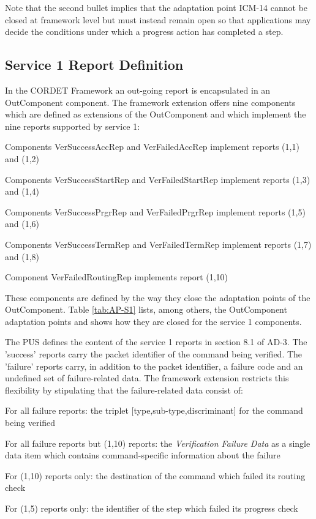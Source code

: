 \documentclass[a4paper,10pt]{article}
\newenvironment{fw_itemize}						%
{\begin{itemize}
  \setlength{\itemsep}{1mm}
  \setlength{\parskip}{0pt}
  \setlength{\parsep}{0pt}}
{\end{itemize}}
\begin{document}
Note that the second bullet implies that the adaptation point ICM-14 cannot be closed at framework level but must instead remain open so that applications may decide the conditions under which a progress action has completed a step.


\subsection{Service 1 Report Definition}\label{sec:serv1RepDef}
In the CORDET Framework an out-going report is encapsulated in an OutComponent component. The framework extension offers nine components which are defined as extensions of the OutComponent and which implement the nine reports supported by service 1:

\begin{fw_itemize}
\item Components VerSuccessAccRep and VerFailedAccRep implement reports (1,1) and (1,2) 
\item Components VerSuccessStartRep and VerFailedStartRep implement reports (1,3) and (1,4) 
\item Components VerSuccessPrgrRep and VerFailedPrgrRep implement reports (1,5) and (1,6) 
\item Components VerSuccessTermRep and VerFailedTermRep implement reports (1,7) and (1,8) 
\item Component VerFailedRoutingRep implements report (1,10)
\end{fw_itemize}

These components are defined by the way they close the adaptation points of the OutComponent. Table \ref{tab:AP-S1} lists, among others, the OutComponent adaptation points and shows how they are closed for the service 1 components.

The PUS defines the content of the service 1 reports in section 8.1 of AD-3. The 'success' reports carry the packet identifier of the command being verified. The 'failure' reports carry, in addition to the packet identifier, a failure code and an undefined set of failure-related data. The framework extension restricts this flexibility by stipulating that the failure-related data consist of: 

\begin{fw_itemize}
\item For all failure reports: the triplet [type,sub-type,discriminant] for the command being verified
\item For all failure reports but (1,10) reports: the \textit{Verification Failure Data} as a single data item which contains command-specific information about the failure 
\item For (1,10) reports only: the destination of the command which failed its routing check
\item For (1,5) reports only: the identifier of the step which failed its progress check
\end{fw_itemize}
\end{document}
